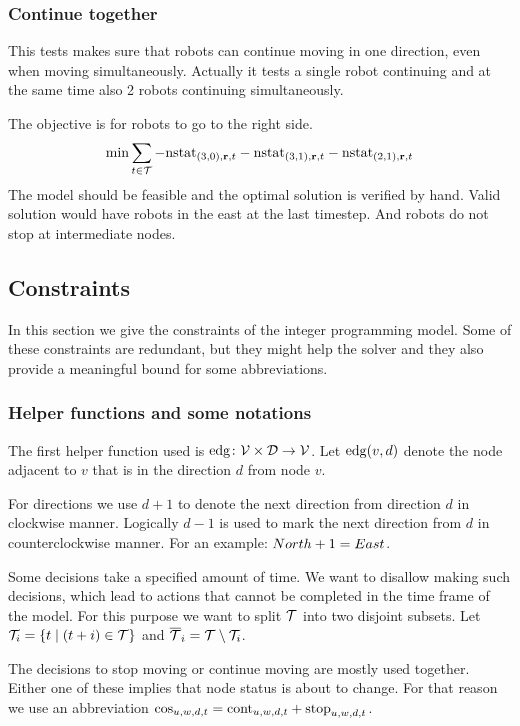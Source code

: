 \subsubsection{Continue together}
This tests makes sure that robots can continue moving in one direction, even
when moving simultaneously. Actually it tests a single robot continuing and at
the same time also 2 robots continuing simultaneously.

The objective is for robots to go to the right side.
\begin{align}
    \min \sum_{t \in \mathcal{T}} -\mathrm{nstat}_{(3,0), \text{\bf r}, t} -\mathrm{nstat}_{(3,1),\text{\bf r},t} -\mathrm{nstat}_{(2,1),\text{\bf r},t}
\end{align}
The model should be feasible and the optimal solution is verified by hand.
Valid solution would have robots in the east at the last timestep. And robots
do not stop at intermediate nodes.

\subsection{Constraints}
\label{sec:constraints}
In this section we give the constraints of the integer programming model. Some
of these constraints are redundant, but they might help the solver and they
also provide a meaningful bound for some abbreviations.
\subsubsection{Helper functions and some notations}
\label{sec:helpers}
The first helper function used is $\mathrm{edg} \colon \mathcal{V} \times \mathcal{D} \to \mathcal{V}$. Let
$\mathrm{edg}(v,d)$ denote the node adjacent to $v$ that is in the direction $d$ from node $v$.

For directions we use $d + 1$ to denote the next direction from direction $d$ in
clockwise manner. Logically $d - 1$ is used to mark the next direction from $d$
in counterclockwise manner. For an example: $North + 1 = East$.

Some decisions take a specified amount of time. We want to disallow making such
decisions, which lead to actions that cannot be completed in the time frame of
the model. For this purpose we want to split $\mathcal{T}$ into two disjoint subsets.
Let $\mathcal{T}_i = \{ t \mid (t+i) \in \mathcal{T}\}$ and $\overline{\mathcal{T}}_i = \mathcal{T} \setminus \mathcal{T}_i$.

The decisions to stop moving or continue moving are mostly used together.
Either one of these implies that node status is about to change. For that
reason we use an abbreviation $\mathrm{cos}_{u,w,d,t} = \mathrm{cont}_{u,w,d,t} +
\mathrm{stop}_{u,w,d,t}$.

